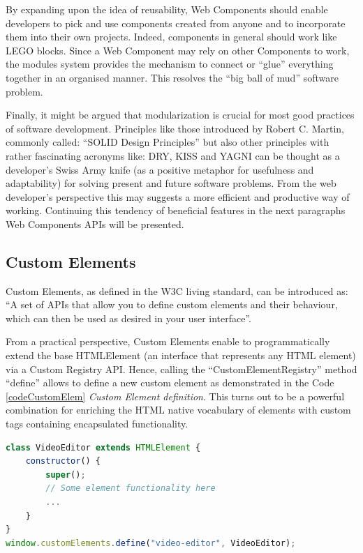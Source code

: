 By expanding upon the idea of reusability, Web Components should enable developers to pick and use components created from anyone and to incorporate them into their own projects. Indeed, components in general should work like LEGO blocks. Since a Web Component may rely on other Components to work, the modules system provides the mechanism to connect or “glue” everything together in an organised manner. This resolves the “big ball of mud” software problem.

Finally, it might be argued that modularization is crucial for most good practices of software development. Principles like those introduced by Robert C. Martin, commonly called: “SOLID Design Principles” but also other principles with rather fascinating acronyms like: DRY, KISS and YAGNI can be thought as a developer’s Swiss Army knife (as a positive metaphor for usefulness and adaptability) for solving present and future software problems. From the web developer’s perspective this may suggests a more efficient and productive way of working. Continuing this tendency of beneficial features in the next paragraphs Web Components APIs will be presented.

\subsection{Custom Elements}
\label{subsec:customElements}

Custom Elements, as defined in the W3C living standard, can be introduced as: “A set of APIs that allow you to define custom elements and their behaviour, which can then be used as desired in your user interface”.

From a practical perspective, Custom Elements enable to programmatically extend the base HTMLElement (an interface that represents any HTML element) via a Custom Registry API. Hence, calling the “CustomElementRegistry” method “define” allows to define a new custom element as demonstrated in the Code \ref{codeCustomElem} \emph{Custom Element definition}. This turns out to be a powerful combination for enriching the HTML native vocabulary of elements with custom tags containing encapsulated functionality.
\\
\begin{lstlisting}[caption={Custom Element definition},label={codeCustomElem}, language=JavaScript]
class VideoEditor extends HTMLElement {
    constructor() {
        super();
        // Some element functionality here
        ...
    }
}
window.customElements.define("video-editor", VideoEditor);
\end{lstlisting}

